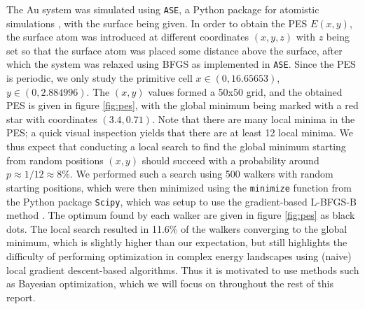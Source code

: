 \documentclass[11pt,a4paper]{article}
\begin{document}
The Au system was simulated using \texttt{ASE}, a Python package for atomistic simulations \cite{ASE}, with the surface being given. In order to obtain the PES $E(x,y)$, the surface atom was introduced at different coordinates $(x,y,z)$ with $z$ being set so that the surface atom was placed some distance above the surface, after which the system was relaxed using BFGS as implemented in \texttt{ASE}. Since the PES is periodic, we only study the primitive cell $x\in\left(0,16.65653\right)$, $y\in\left(0,2.884996\right)$. The $(x,y)$ values formed a 50x50 grid, and the obtained PES is given in figure \ref{fig:pes}, with the global minimum being marked with a red star with coordinates $(3.4, 0.71)$. Note that there are many local minima in the PES; a quick visual inspection yields that there are at least 12 local minima. We thus expect that conducting a local search to find the global minimum starting from random positions $(x,y)$ should succeed with a probability around $p \approx 1/12 \approx 8\%$. We performed such a search using 500 walkers with random starting positions, which were then minimized using the \texttt{minimize} function from the Python package \texttt{Scipy}, which was setup to use the gradient-based L-BFGS-B method \cite{scipy_min}. The optimum found by each walker are given in figure \ref{fig:pes} as black dots. The local search resulted in 11.6\% of the walkers converging to the global minimum, which is slightly higher than our expectation, but still highlights the difficulty of performing optimization in complex energy landscapes using (naive) local gradient descent-based algorithms. Thus it is motivated to use methods such as Bayesian optimization, which we will focus on throughout the rest of this report. 
\end{document}
